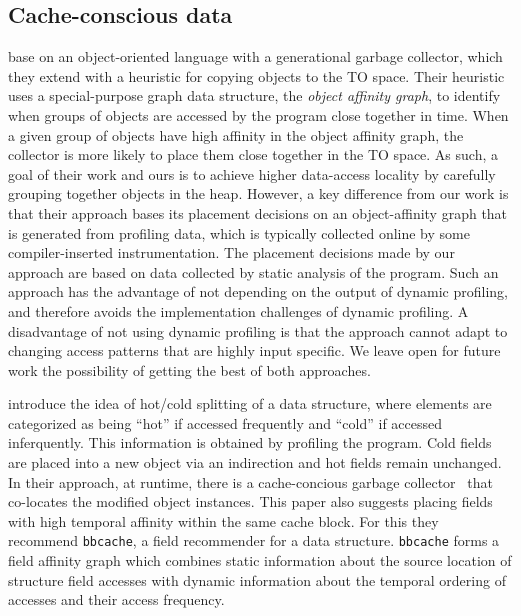 \documentclass[acmsmall,review,anonymous]{acmart}\settopmatter{printfolios=true,printccs=false,printacmref=false}
\begin{document}
\subsection{Cache-conscious data}

\citet{ccgarbage} base on an object-oriented language with a
generational garbage collector, which they extend with a heuristic for
copying objects to the TO space.
Their heuristic uses a special-purpose graph data structure, the \emph{object affinity
graph}, to identify when groups of objects are accessed by the program
close together in time.
When a given group of objects have high affinity in the object
affinity graph, the collector is more likely to place them close
together in the TO space.
As such, a goal of their work and ours is to achieve higher data-access locality
by carefully grouping together objects in the heap.
However, a key difference from our work is that their approach bases its placement decisions
on an object-affinity graph that is generated from profiling data, which is
typically collected online by some compiler-inserted instrumentation.
The placement decisions made by our approach are based on data collected by static analysis of the program.
Such an approach has the advantage of not depending on the output of dynamic profiling, and therefore
avoids the implementation challenges of dynamic profiling.
A disadvantage of not using dynamic profiling is that the approach
cannot adapt to changing access patterns that are highly input
specific.
We leave open for future work the possibility of getting the best of both approaches.




\citet{CSD} introduce the idea of hot/cold splitting of a data structure, where elements are categorized as being ``hot'' if accessed frequently and ``cold'' if accessed inferquently.
This information is obtained by profiling the program. Cold fields are placed into a new object via an indirection and hot fields remain unchanged. In their approach, at runtime, there is a cache-concious garbage collector~\cite{ccgarbage} that co-locates the modified object instances.
This paper also suggests placing fields with high temporal affinity within the same cache block. For this they recommend  \texttt{bbcache}, a field recommender for a data structure. \texttt{bbcache} forms a field affinity graph which combines static information about the source location of structure field accesses with dynamic information about the temporal ordering of accesses and their access frequency.
\end{document}

